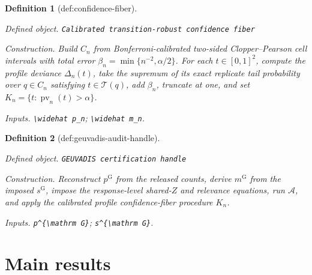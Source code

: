 \documentclass{article}
\newtheorem{definition}{Definition}
\begin{document}
\begin{definition}[def:confidence-fiber]\label{def:confidence-fiber}
\par\smallskip\noindent\emph{Defined object.} \texttt{Calibrated transition-\allowbreak{}robust confidence fiber}
\par\smallskip\noindent\emph{Construction.} Build \(C_n\) from Bonferroni-calibrated two-sided Clopper--Pearson cell intervals with total error \(\beta_n=\min\{n^{-2},\alpha/2\}\). For each \(t\in[0,1]^2\), compute the profile deviance \(\Delta_n(t)\), take the supremum of its exact replicate tail probability over \(q\in C_n\) satisfying \(t\in\mathcal T(q)\), add \(\beta_n\), truncate at one, and set \(K_n=\{t:\operatorname{pv}_n(t)>\alpha\}\).
\par\smallskip\noindent\emph{Inputs.} \texttt{\textbackslash{}\allowbreak{}widehat p\_\allowbreak{}n}; \texttt{\textbackslash{}\allowbreak{}widehat m\_\allowbreak{}n}.
\end{definition}

\begin{definition}[def:geuvadis-audit-handle]\label{def:geuvadis-audit-handle}
\par\smallskip\noindent\emph{Defined object.} \texttt{GEUVADIS certification handle}
\par\smallskip\noindent\emph{Construction.} Reconstruct \(p^{\mathrm G}\) from the released counts, derive \(m^{\mathrm G}\) from the imposed \(s^{\mathrm G}\), impose the response-level shared-\(Z\) and relevance equations, run \(\mathscr A\), and apply the calibrated profile confidence-fiber procedure \(K_n\).
\par\smallskip\noindent\emph{Inputs.} \texttt{p\textasciicircum{}\{\textbackslash{}\allowbreak{}mathrm G\}\allowbreak{}}; \texttt{s\textasciicircum{}\{\textbackslash{}\allowbreak{}mathrm G\}\allowbreak{}}.
\end{definition}

\section{Main results}
\end{document}
